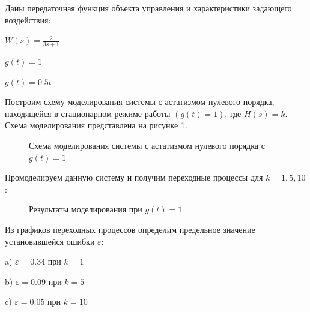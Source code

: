 \documentclass[a4paper, 11pt]{article}
\begin{document}
\par
Даны передаточная функция объекта управления и характеристики задающего воздействия:
\par 
$W(s) = \displaystyle \frac{2}{3s+1}$
\par 
$g(t) = 1$
\par 
$g(t)=0.5t$
\par
Построим схему моделирования системы с астатизмом нулевого порядка, находящейся в стационарном режиме работы $(g(t) = 1)$, где $H(s)=k$. Схема моделирования представлена на рисунке 1.

\begin{figure}[h!]
\caption{Схема моделирования системы с астатизмом нулевого порядка с $g(t)=1$}
\label{ris:image}
\end{figure}

\par 
Промоделируем данную систему и получим переходные процессы для $k=1,5,10$:

\begin{figure}[h!]
\centering
{}
\caption{Результаты моделирования при $g(t)=1$}
\end{figure}

\par 
Из графиков переходных процессов определим предельное значение установившейся ошибки $\varepsilon$:
\par 
a) $\varepsilon=0.34$ при $k=1$ 
\par 
b) $\varepsilon=0.09$ при $k=5$
\par 
c) $\varepsilon=0.05$ при $k=10$
\end{document}
